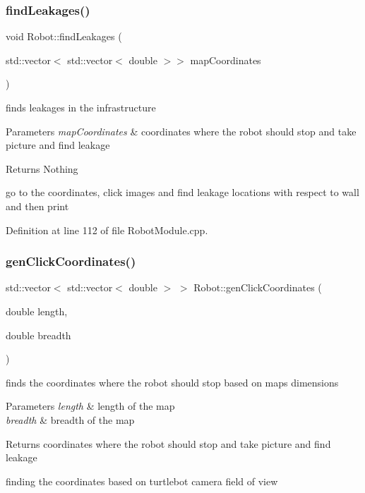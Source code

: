 \subsubsection{\texorpdfstring{find\+Leakages()}{findLeakages()}}
{\footnotesize\ttfamily void Robot\+::find\+Leakages (\begin{DoxyParamCaption}\item[{std\+::vector$<$ std\+::vector$<$ double $>$$>$}]{map\+Coordinates }\end{DoxyParamCaption})}



finds leakages in the infrastructure 


\begin{DoxyParams}{Parameters}
{\em map\+Coordinates} & coordinates where the robot should stop and take picture and find leakage\\
\hline
\end{DoxyParams}
\begin{DoxyReturn}{Returns}
Nothing 
\end{DoxyReturn}
go to the coordinates, click images and find leakage locations with respect to wall and then print 

Definition at line 112 of file Robot\+Module.\+cpp.

\mbox{\label{class_robot_a4513409a1fd7ec6e9b271d268d7b8217}} 
\subsubsection{\texorpdfstring{gen\+Click\+Coordinates()}{genClickCoordinates()}}
{\footnotesize\ttfamily std\+::vector$<$ std\+::vector$<$ double $>$ $>$ Robot\+::gen\+Click\+Coordinates (\begin{DoxyParamCaption}\item[{double}]{length,  }\item[{double}]{breadth }\end{DoxyParamCaption})}



finds the coordinates where the robot should stop based on map\textquotesingle{}s dimensions 


\begin{DoxyParams}{Parameters}
{\em length} & length of the map\\
\hline
{\em breadth} & breadth of the map\\
\hline
\end{DoxyParams}
\begin{DoxyReturn}{Returns}
coordinates where the robot should stop and take picture and find leakage 
\end{DoxyReturn}
finding the coordinates based on turtlebot camera field of view

